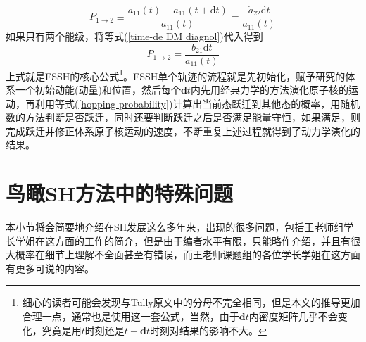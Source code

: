 \documentclass[12pt,a4paper,openany,twoside]{book}
\numberwithin{equation}{section}
\begin{document}
        \begin{equation}
          P_{1\rightarrow2}\equiv\frac{a_{11}(t)-a_{11}(t+\mathrm{d}t)}{a_{11}(t)}=\frac{\dot{a}_{22} \mathrm{d}t }{ a_{11}(t)}
        \end{equation}
        如果只有两个能级，将等式(\ref{time-de DM diagnol})代入得到
        \begin{equation}
          P_{1\rightarrow2}=\frac{b_{21} \mathrm{d}t }{ a_{11}(t)}
          \label{hopping probability}
        \end{equation}
        上式就是FSSH的核心公式\footnote{细心的读者可能会发现与Tully原文中的分母不完全相同，但是本文的推导更加合理一点，通常也是使用这一套公式，当然，由于$\mathbf{d}t$内密度矩阵几乎不会变化，究竟是用$t$时刻还是$t+\mathbf{d}t$时刻对结果的影响不大。}。FSSH单个轨迹的流程就是先初始化，赋予研究的体系一个初始动能(动量)和位置，然后每个$\mathbf{d}t$内先用经典力学的方法演化原子核的运动，再利用等式(\ref{hopping probability})计算出当前态跃迁到其他态的概率，用随机数的方法判断是否跃迁，同时还要判断跃迁之后是否满足能量守恒，如果满足，则完成跃迁并修正体系原子核运动的速度，不断重复上述过程就得到了动力学演化的结果。
        
      \section{鸟瞰SH方法中的特殊问题}
        本小节将会简要地介绍在SH发展这么多年来，出现的很多问题，包括王老师组学长学姐在这方面的工作的简介，但是由于编者水平有限，只能略作介绍，并且有很大概率在细节上理解不全面甚至有错误，而王老师课题组的各位学长学姐在这方面有更多可说的内容。
\end{document}

